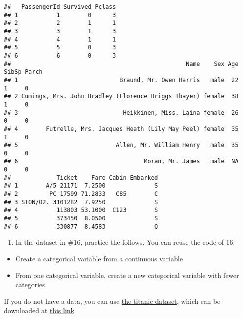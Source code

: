 \documentclass[
]{article}
\providecommand{\tightlist}{%
  \setlength{\itemsep}{0pt}\setlength{\parskip}{0pt}}
\begin{document}
\begin{verbatim}
##   PassengerId Survived Pclass
## 1           1        0      3
## 2           2        1      1
## 3           3        1      3
## 4           4        1      1
## 5           5        0      3
## 6           6        0      3
##                                                  Name    Sex Age SibSp Parch
## 1                             Braund, Mr. Owen Harris   male  22     1     0
## 2 Cumings, Mrs. John Bradley (Florence Briggs Thayer) female  38     1     0
## 3                              Heikkinen, Miss. Laina female  26     0     0
## 4        Futrelle, Mrs. Jacques Heath (Lily May Peel) female  35     1     0
## 5                            Allen, Mr. William Henry   male  35     0     0
## 6                                    Moran, Mr. James   male  NA     0     0
##             Ticket    Fare Cabin Embarked
## 1        A/5 21171  7.2500              S
## 2         PC 17599 71.2833   C85        C
## 3 STON/O2. 3101282  7.9250              S
## 4           113803 53.1000  C123        S
## 5           373450  8.0500              S
## 6           330877  8.4583              Q
\end{verbatim}

\begin{enumerate}
\def\labelenumi{\arabic{enumi}.}
\setcounter{enumi}{16}
\tightlist
\item
  In the dataset in \#16, practice the follows. You can reuse the code
  of 16.
\end{enumerate}

\begin{itemize}
\tightlist
\item
  Create a categorical variable from a continuous variable
\item
  From one categorical variable, create a new categorical variable with
  fewer categories
\end{itemize}

If you do not have a data, you can use
\href{https://www.kaggle.com/competitions/titanic/overview}{the titanic
dataset}, which can be downloaded at \href{../data/titanic.csv}{this
link}
\end{document}
